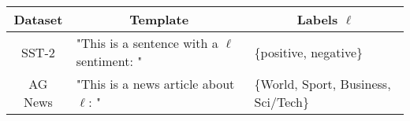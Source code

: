  \begin{tabular}{cll}
   \toprule
   Dataset & \multicolumn{1}{c}{Template \prompt{\ell}} & \multicolumn{1}{c}{Labels $\ell$} \\
   \midrule 
   SST-2  & "This is a sentence with a $\ell$ sentiment: " & \{positive, negative\} \\[5pt] 
   AG News & "This is a news article about $\ell$: " & \{World, Sport, Business, Sci/Tech\} \\
   \bottomrule
\end{tabular}
 